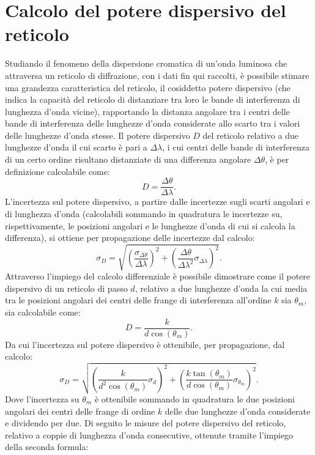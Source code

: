 \documentclass[a4paper,12pt]{article}
\begin{document}
\section{Calcolo del potere dispersivo del reticolo}
Studiando il fenomeno della dispersione cromatica di un’onda luminosa che attraversa un reticolo di diffrazione, con i dati fin qui raccolti, è possibile stimare una grandezza caratteristica del reticolo, il cosiddetto potere dispersivo (che indica la capacità del reticolo di distanziare tra loro le bande di interferenza di lunghezza d’onda vicine), rapportando la distanza angolare tra i centri delle bande di interferenza delle lunghezze d’onda considerate allo scarto tra i valori delle lunghezze d’onda stesse.
Il potere dispersivo \( D \) del reticolo relativo a due lunghezze d’onda il cui scarto è pari a \( \Delta\lambda \), i cui centri delle bande di interferenza di un certo ordine risultano distanziate di una differenza angolare \( \Delta\theta \), è per definizione calcolabile come:
\[
D = \frac{\Delta\theta}{\Delta\lambda}.
\]
L’incertezza sul potere dispersivo, a partire dalle incertezze sugli scarti angolari e di lunghezza d’onda (calcolabili sommando in quadratura le incertezze su, rispettivamente, le posizioni angolari e le lunghezze d’onda di cui si calcola la differenza), si ottiene per propagazione delle incertezze dal calcolo:
\[
\sigma_D = \sqrt{\left(\frac{\sigma_{\Delta\theta}}{\Delta\lambda}\right)^2 + \left(\frac{\Delta\theta}{\Delta\lambda^2}\sigma_{\Delta\lambda}\right)^2}.
\]
Attraverso l’impiego del calcolo differenziale è possibile dimostrare come il potere dispersivo di un reticolo di passo \( d \), relativo a due lunghezze d’onda la cui media tra le posizioni angolari dei centri delle frange di interferenza all’ordine \( k \) sia \( \theta_m \), sia calcolabile come:
\[
D = \frac{k}{d \cos(\theta_m)}.
\]
Da cui l’incertezza sul potere dispersivo è ottenibile, per propagazione, dal calcolo:
\[
\sigma_D = \sqrt{\left(\frac{k}{d^2 \cos(\theta_m)}\sigma_d\right)^2 + \left(\frac{k \tan(\theta_m)}{d \cos(\theta_m)}\sigma_{\theta_m}\right)^2}.
\]
Dove l’incertezza su \( \theta_m \) è ottenibile sommando in quadratura le due posizioni angolari dei centri delle frange di ordine \( k \) delle due lunghezze d’onda considerate e dividendo per due.
Di seguito le misure del potere dispersivo del reticolo, relativo a coppie di lunghezza d’onda consecutive, ottenute tramite l’impiego della seconda formula:
\end{document}

